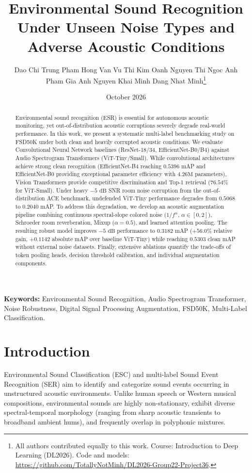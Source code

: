 \documentclass[11pt,a4paper]{article}
\title{\textbf{Environmental Sound Recognition Under Unseen Noise Types and Adverse Acoustic Conditions}}
\author{
    Dao Chi Trung \quad
    Pham Hong Van \quad
    Vu Thi Kim Oanh \quad
    Nguyen Thi Ngoc Anh \\
    Pham Gia Anh \quad
    Nguyen Khai Minh \quad
    Dang Nhat Minh\footnote{All authors contributed equally to this work. Course: Introduction to Deep Learning (DL2026). Code and models: \url{https://github.com/TotallyNotMinh/DL2026-Group22-Project36}.}
}
\date{October 2026}
\begin{document}
\maketitle

\begin{abstract}
Environmental sound recognition (ESR) is essential for autonomous acoustic monitoring, yet out-of-distribution acoustic corruptions severely degrade real-world performance. In this work, we present a systematic multi-label benchmarking study on FSD50K under both clean and heavily corrupted acoustic conditions. We evaluate Convolutional Neural Network baselines (ResNet-18/34, EfficientNet-B0/B4) against Audio Spectrogram Transformers (ViT-Tiny/Small). While convolutional architectures achieve strong clean recognition (EfficientNet-B4 reaching $0.5396$ mAP and EfficientNet-B0 providing exceptional parameter efficiency with $4.26\text{M}$ parameters), Vision Transformers provide competitive discrimination and Top-1 retrieval ($76.54\%$ for ViT-Small). Under heavy $-5\text{ dB}$ SNR room noise corruption from the out-of-distribution ACE benchmark, undefended ViT-Tiny performance degrades from $0.5068$ to $0.2040$ mAP. To address this degradation, we develop an acoustic augmentation pipeline combining continuous spectral-slope colored noise ($1/f^\alpha$, $\alpha \in [0, 2]$), Schroeder room reverberation, Mixup ($\alpha=0.5$), and learned attention pooling. The resulting robust model improves $-5\text{ dB}$ performance to $0.3182$ mAP ($+56.0\%$ relative gain, $+0.1142$ absolute mAP over baseline ViT-Tiny) while reaching $0.5303$ clean mAP without external noise datasets. Finally, extensive ablations quantify the trade-offs of token pooling heads, decision threshold calibration, and individual augmentation components.
\end{abstract}

\textbf{Keywords:} Environmental Sound Recognition, Audio Spectrogram Transformer, Noise Robustness, Digital Signal Processing Augmentation, FSD50K, Multi-Label Classification.

\section{Introduction}
Environmental Sound Classification (ESC) and multi-label Sound Event Recognition (SER) aim to identify and categorize sound events occurring in unstructured acoustic environments. Unlike human speech or Western musical compositions, environmental sounds are highly non-stationary, exhibit diverse spectral-temporal morphology (ranging from sharp acoustic transients to broadband ambient hums), and frequently overlap in polyphonic mixtures.
\end{document}
